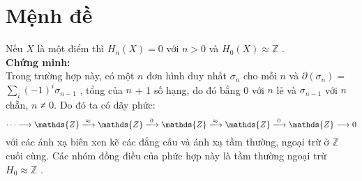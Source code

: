 \section{Mệnh đề}
\indent Nếu \(X\) là một điểm thì \(H_n(X) = 0\) với \(n > 0\) và \(H_0(X) \approx \mathds{Z} \)  . \\
\textbf{Chứng minh:} \\
Trong trường hợp này, có một \(n\) đơn hình duy nhất \(\sigma_n\) cho mỗi \(n\) và \(\partial(\sigma_n)=\) \(\sum_i(-1)^{i}\sigma_{n-1}\) , tổng của \(n\) + 1 số hạng, do đó bằng 0 với \(n\) lẻ và \(\sigma_{n-1}\) với \(n\) chẵn, \(n\) ≠ 0. Do đó ta có dãy phức:
\[\cdots \longrightarrow \mathds{Z}  \xlongrightarrow[]{\approx} \mathds{Z} \xlongrightarrow[]{0} \mathds{Z} \xlongrightarrow[]{\approx} \mathds{Z} \xlongrightarrow[]{0} \mathds{Z} \longrightarrow 0\]
với các ánh xạ biên  xen kẽ các đẳng cấu và ánh xạ tầm thường, ngoại trừ ở  \(\mathds{Z}\)  cuối cùng. Các nhóm đồng điều của phức hợp này là tầm thường ngoại trừ \(H_0 \approx \mathds{Z}  \) .

